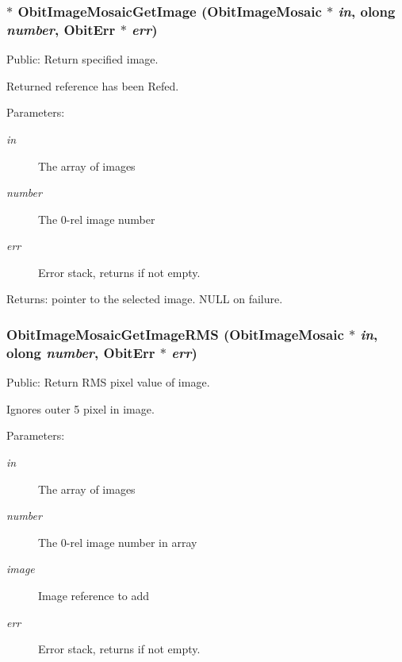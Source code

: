 \subsubsection{$\ast$ Obit\-Image\-Mosaic\-Get\-Image ({\bf Obit\-Image\-Mosaic} $\ast$ {\em in}, {\bf olong} {\em number}, {\bf Obit\-Err} $\ast$ {\em err})}\label{ObitImageMosaic_8c_a15}


Public: Return specified image. 

Returned reference has been Refed. \begin{Desc}
\item[Parameters:]
\begin{description}
\item[{\em in}]The array of images \item[{\em number}]The 0-rel image number \item[{\em err}]Error stack, returns if not empty. \end{description}
\end{Desc}
\begin{Desc}
\item[Returns:]pointer to the selected image. NULL on failure. \end{Desc}
\subsubsection{ Obit\-Image\-Mosaic\-Get\-Image\-RMS ({\bf Obit\-Image\-Mosaic} $\ast$ {\em in}, {\bf olong} {\em number}, {\bf Obit\-Err} $\ast$ {\em err})}\label{ObitImageMosaic_8c_a17}


Public: Return RMS pixel value of image. 

Ignores outer 5 pixel in image. \begin{Desc}
\item[Parameters:]
\begin{description}
\item[{\em in}]The array of images \item[{\em number}]The 0-rel image number in array \item[{\em image}]Image reference to add \item[{\em err}]Error stack, returns if not empty. \end{description}
\end{Desc}
